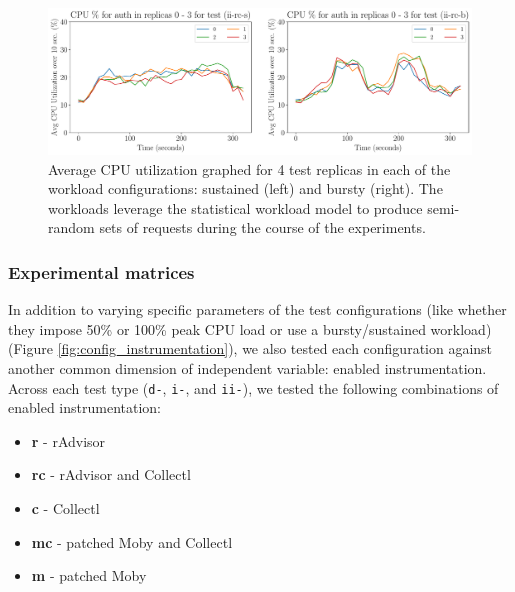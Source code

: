 \documentclass[a4paper,11pt]{article}
\begin{document}
\begin{enumerate}
    \begin{minipage}{\linewidth}
        \begin{figure}[H]
            \vspace{-0.6em}
            \centering
            \includegraphics[width=\textwidth]{graphs/evaluation_s_b.pdf}
            \vspace{-0.5em}
            \caption{
                Average CPU utilization graphed for 4 test replicas in each of the workload configurations:
                sustained (left) and bursty (right).
                The workloads leverage the statistical workload model to produce semi-random sets of requests
                during the course of the experiments.
            }
            \label{fig:evaluation_s_b}
            \vspace{1em}
        \end{figure}
    \end{minipage}
\end{enumerate}

\subsubsection{Experimental matrices}

In addition to varying specific parameters of the test configurations
(like whether they impose 50\% or 100\% peak CPU load or use a bursty/sustained workload) (Figure \ref{fig:config_instrumentation}),
we also tested each configuration against another common dimension of independent variable:
enabled instrumentation.
Across each test type (\texttt{d-}, \texttt{i-}, and \texttt{ii-}),
we tested the following combinations of enabled instrumentation:

\vspace{-0.3em}
\begin{itemize}
    \itemsep-0.15em 
    \item \textbf{r} - rAdvisor
    \item \textbf{rc} - rAdvisor and Collectl
    \item \textbf{c} - Collectl
    \item \textbf{mc} - patched Moby and Collectl
    \item \textbf{m} - patched Moby
\end{itemize}
\vspace{-0.45em}
\end{document}
